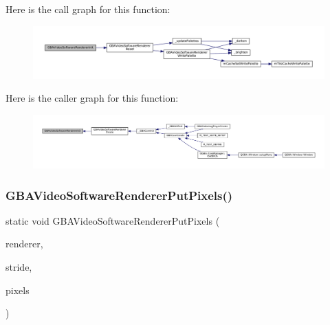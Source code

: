 Here is the call graph for this function\+:
\nopagebreak
\begin{figure}[H]
\begin{center}
\leavevmode
\includegraphics[width=350pt]{video-software_8c_af96caae6a353b68c77615b83bfee10cb_cgraph}
\end{center}
\end{figure}
Here is the caller graph for this function\+:
\nopagebreak
\begin{figure}[H]
\begin{center}
\leavevmode
\includegraphics[width=350pt]{video-software_8c_af96caae6a353b68c77615b83bfee10cb_icgraph}
\end{center}
\end{figure}
\mbox{\label{video-software_8c_a6b275066e87074226e4be5673be71dbc}} 
\subsubsection{\texorpdfstring{G\+B\+A\+Video\+Software\+Renderer\+Put\+Pixels()}{GBAVideoSoftwareRendererPutPixels()}}
{\footnotesize\ttfamily static void G\+B\+A\+Video\+Software\+Renderer\+Put\+Pixels (\begin{DoxyParamCaption}\item[{struct G\+B\+A\+Video\+Renderer $\ast$}]{renderer,  }\item[{size\+\_\+t}]{stride,  }\item[{const void $\ast$}]{pixels }\end{DoxyParamCaption})\hspace{0.3cm}{\ttfamily [static]}}

